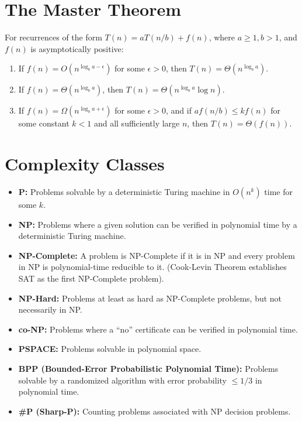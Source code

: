 \documentclass[11pt]{article}
\begin{document}
\section{The Master Theorem}
For recurrences of the form \(T(n) = aT(n/b) + f(n)\), where \(a \ge 1, b > 1\), and \(f(n)\) is asymptotically positive:
\begin{enumerate}
    \item If \(f(n) = O(n^{\log_b a - \epsilon})\) for some \(\epsilon > 0\), then \(T(n) = \Theta(n^{\log_b a})\).
    \item If \(f(n) = \Theta(n^{\log_b a})\), then \(T(n) = \Theta(n^{\log_b a} \log n)\).
    \item If \(f(n) = \Omega(n^{\log_b a + \epsilon})\) for some \(\epsilon > 0\), and if \(a f(n/b) \le k f(n)\) for some constant \(k < 1\) and all sufficiently large \(n\), then \(T(n) = \Theta(f(n))\).
\end{enumerate}

\section{Complexity Classes}
\begin{itemize}
    \item \textbf{P:} Problems solvable by a deterministic Turing machine in \(O(n^k)\) time for some \(k\).
    \item \textbf{NP:} Problems where a given solution can be verified in polynomial time by a deterministic Turing machine.
    \item \textbf{NP-Complete:} A problem is NP-Complete if it is in NP and every problem in NP is polynomial-time reducible to it. (Cook-Levin Theorem establishes SAT as the first NP-Complete problem).
    \item \textbf{NP-Hard:} Problems at least as hard as NP-Complete problems, but not necessarily in NP.
    \item \textbf{co-NP:} Problems where a ``no'' certificate can be verified in polynomial time.
    \item \textbf{PSPACE:} Problems solvable in polynomial space.
    \item \textbf{BPP (Bounded-Error Probabilistic Polynomial Time):} Problems solvable by a randomized algorithm with error probability \(\le 1/3\) in polynomial time.
    \item \textbf{\#P (Sharp-P):} Counting problems associated with NP decision problems.
\end{itemize}
\end{document}
